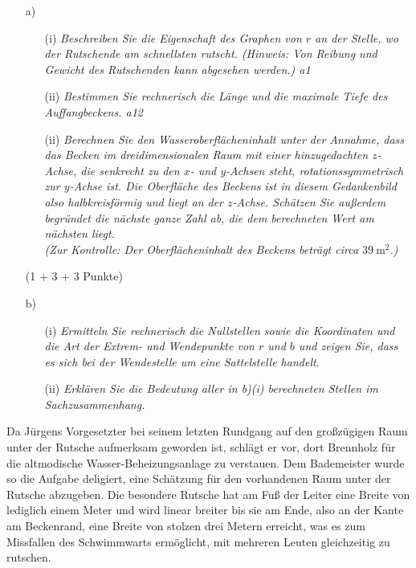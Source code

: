 \documentclass[ngerman, a4paper, 11pt]{article}
\begin{document}
\begin{enumerate}
    \item[a)]
        \begin{enumerate}
            \item[(i)]
                \textit{Beschreiben Sie die Eigenschaft des Graphen von $r$ an der Stelle, wo der Rutschende am schnellsten rutscht. (Hinweis: Von Reibung und Gewicht des Rutschenden kann abgesehen werden.) a1}
            \item[(ii)]    
                \textit{Bestimmen Sie rechnerisch die Länge und die maximale Tiefe des Auffangbeckens. a12}
            \item[(ii)]
                \textit{Berechnen Sie den Wasseroberflächeninhalt unter der Annahme,
                dass das Becken im dreidimensionalen Raum mit einer hinzugedachten $z$-Achse,
                die senkrecht zu den $x$- und $y$-Achsen steht, rotationssymmetrisch zur $y$-Achse ist.
                Die Oberfläche des Beckens ist in diesem Gedankenbild also halbkreisförmig und liegt an der $z$-Achse.
                Schätzen Sie außerdem begründet die nächste ganze Zahl ab, die dem berechneten Wert am nächsten liegt.\\
                (Zur Kontrolle: Der Oberflächeninhalt des Beckens beträgt circa $\SI{39}{\square\metre}$.)}
        \end{enumerate}
        \begin{flushright}
            (1 + 3 + 3 Punkte)
        \end{flushright}
    \item[b)]
        \begin{enumerate}
            \item[(i)]
                \textit{Ermitteln Sie rechnerisch die Nullstellen
                sowie die Koordinaten und die Art der Extrem- und Wendepunkte von $r$ und $b$
                und zeigen Sie, dass es sich bei der Wendestelle um eine Sattelstelle handelt.}
            \item[(ii)]
                \textit{Erklären Sie die Bedeutung aller in b)(i) berechneten Stellen im Sachzusammenhang.}
        \end{enumerate}
\end{enumerate}

Da Jürgens Vorgesetzter bei seinem letzten Rundgang auf den großzügigen Raum unter der Rutsche aufmerksam geworden ist,
schlägt er vor, dort Brennholz für die altmodische Wasser-Beheizungsanlage zu verstauen.
Dem Bademeister wurde so die Aufgabe deligiert, eine Schätzung für den vorhandenen Raum unter der Rutsche abzugeben.
Die besondere Rutsche hat am Fuß der Leiter eine Breite von lediglich einem Meter und wird linear breiter
bis sie am Ende, also an der Kante am Beckenrand, eine Breite von stolzen drei Metern erreicht,
was es zum Missfallen des Schwimmwarts ermöglicht, mit mehreren Leuten gleichzeitig zu rutschen.
\end{document}
